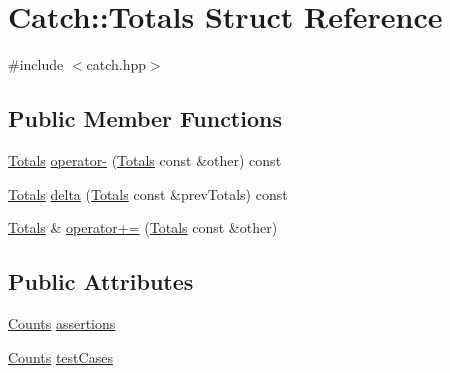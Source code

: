 \hypertarget{structCatch_1_1Totals}{\section{Catch\-:\-:Totals Struct Reference}
\label{structCatch_1_1Totals}
}


{\ttfamily \#include $<$catch.\-hpp$>$}

\subsection*{Public Member Functions}
\begin{DoxyCompactItemize}
\item 
\hyperlink{structCatch_1_1Totals}{Totals} \hyperlink{structCatch_1_1Totals_abe15cd8a82ba9a4868dd7a542add827c}{operator-\/} (\hyperlink{structCatch_1_1Totals}{Totals} const \&other) const 
\item 
\hyperlink{structCatch_1_1Totals}{Totals} \hyperlink{structCatch_1_1Totals_a3dee0f599c081a8360c0112fb1dafe8f}{delta} (\hyperlink{structCatch_1_1Totals}{Totals} const \&prev\-Totals) const 
\item 
\hyperlink{structCatch_1_1Totals}{Totals} \& \hyperlink{structCatch_1_1Totals_a574015076e54cc405c70b053e3356e43}{operator+=} (\hyperlink{structCatch_1_1Totals}{Totals} const \&other)
\end{DoxyCompactItemize}
\subsection*{Public Attributes}
\begin{DoxyCompactItemize}
\item 
\hyperlink{structCatch_1_1Counts}{Counts} \hyperlink{structCatch_1_1Totals_a885ded66df752147b30c3d45aa602ec9}{assertions}
\item 
\hyperlink{structCatch_1_1Counts}{Counts} \hyperlink{structCatch_1_1Totals_adb195fe477aedee2ecea88c888f16506}{test\-Cases}
\end{DoxyCompactItemize}


